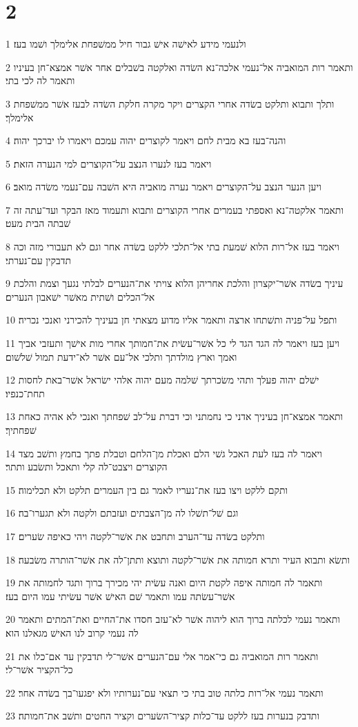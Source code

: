 \chapter{2}

\par 1 ולנעמי מידע לאישׁה אישׁ גבור חיל ממשׁפחת אלימלך ושׁמו בעז׃
\par 2 ותאמר רות המואביה אל־נעמי אלכה־נא השׂדה ואלקטה בשׁבלים אחר אשׁר אמצא־חן בעיניו ותאמר לה לכי בתי׃
\par 3 ותלך ותבוא ותלקט בשׂדה אחרי הקצרים ויקר מקרה חלקת השׂדה לבעז אשׁר ממשׁפחת אלימלך׃
\par 4 והנה־בעז בא מבית לחם ויאמר לקוצרים יהוה עמכם ויאמרו לו יברכך יהוה׃
\par 5 ויאמר בעז לנערו הנצב על־הקוצרים למי הנערה הזאת׃
\par 6 ויען הנער הנצב על־הקוצרים ויאמר נערה מואביה היא השׁבה עם־נעמי משׂדה מואב׃
\par 7 ותאמר אלקטה־נא ואספתי בעמרים אחרי הקוצרים ותבוא ותעמוד מאז הבקר ועד־עתה זה שׁבתה הבית מעט׃
\par 8 ויאמר בעז אל־רות הלוא שׁמעת בתי אל־תלכי ללקט בשׂדה אחר וגם לא תעבורי מזה וכה תדבקין עם־נערתי׃
\par 9 עיניך בשׂדה אשׁר־יקצרון והלכת אחריהן הלוא צויתי את־הנערים לבלתי נגעך וצמת והלכת אל־הכלים ושׁתית מאשׁר ישׁאבון הנערים׃
\par 10 ותפל על־פניה ותשׁתחו ארצה ותאמר אליו מדוע מצאתי חן בעיניך להכירני ואנכי נכריה׃
\par 11 ויען בעז ויאמר לה הגד הגד לי כל אשׁר־עשׂית את־חמותך אחרי מות אישׁך ותעזבי אביך ואמך וארץ מולדתך ותלכי אל־עם אשׁר לא־ידעת תמול שׁלשׁום׃
\par 12 ישׁלם יהוה פעלך ותהי משׂכרתך שׁלמה מעם יהוה אלהי ישׂראל אשׁר־באת לחסות תחת־כנפיו׃
\par 13 ותאמר אמצא־חן בעיניך אדני כי נחמתני וכי דברת על־לב שׁפחתך ואנכי לא אהיה כאחת שׁפחתיך׃
\par 14 ויאמר לה בעז לעת האכל גשׁי הלם ואכלת מן־הלחם וטבלת פתך בחמץ ותשׁב מצד הקוצרים ויצבט־לה קלי ותאכל ותשׂבע ותתר׃
\par 15 ותקם ללקט ויצו בעז את־נעריו לאמר גם בין העמרים תלקט ולא תכלימוה׃
\par 16 וגם שׁל־תשׁלו לה מן־הצבתים ועזבתם ולקטה ולא תגערו־בה׃
\par 17 ותלקט בשׂדה עד־הערב ותחבט את אשׁר־לקטה ויהי כאיפה שׂערים׃
\par 18 ותשׂא ותבוא העיר ותרא חמותה את אשׁר־לקטה ותוצא ותתן־לה את אשׁר־הותרה משׂבעה׃
\par 19 ותאמר לה חמותה איפה לקטת היום ואנה עשׂית יהי מכירך ברוך ותגד לחמותה את אשׁר־עשׂתה עמו ותאמר שׁם האישׁ אשׁר עשׂיתי עמו היום בעז׃
\par 20 ותאמר נעמי לכלתה ברוך הוא ליהוה אשׁר לא־עזב חסדו את־החיים ואת־המתים ותאמר לה נעמי קרוב לנו האישׁ מגאלנו הוא׃
\par 21 ותאמר רות המואביה גם כי־אמר אלי עם־הנערים אשׁר־לי תדבקין עד אם־כלו את כל־הקציר אשׁר־לי׃
\par 22 ותאמר נעמי אל־רות כלתה טוב בתי כי תצאי עם־נערותיו ולא יפגעו־בך בשׂדה אחר׃
\par 23 ותדבק בנערות בעז ללקט עד־כלות קציר־השׂערים וקציר החטים ותשׁב את־חמותה׃

